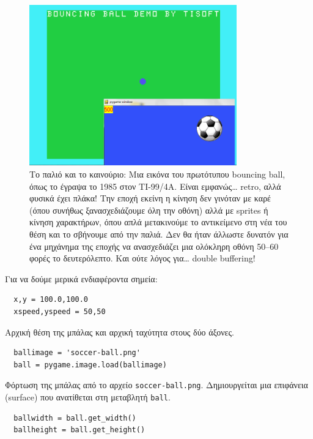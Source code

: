 \begin{figure}
  \centering
  \includegraphics[width=0.8\textwidth]{images/chapter4/bounce1}
  \caption[Παλιό και νέο bouncing ball]{Το παλιό και το καινούριο: Μια εικόνα του πρωτότυπου bouncing ball,  όπως το έγραψα το 1985 στον TI-99/4A.  Είναι εμφανώς\ldots{} retro, αλλά φυσικά έχει πλάκα! Την εποχή εκείνη η κίνηση δεν γινόταν με καρέ (όπου συνήθως ξανασχεδιάζουμε όλη την οθόνη) αλλά με sprites ή κίνηση χαρακτήρων, όπου απλά μετακινούμε το αντικείμενο στη νέα του θέση και το σβήνουμε από την παλιά. Δεν θα ήταν άλλωστε δυνατόν για ένα μηχάνημα της εποχής να ανασχεδιάζει μια ολόκληρη οθόνη 50--60 φορές το δευτερόλεπτο. Και ούτε λόγος για\ldots{} double buffering!}
  \label{4-1}
\end{figure}

Για να δούμε μερικά ενδιαφέροντα σημεία:

\begin{verbatim}
  x,y = 100.0,100.0
  xspeed,yspeed = 50,50
\end{verbatim}

Αρχική θέση της μπάλας και αρχική ταχύτητα στους δύο άξονες.

\begin{verbatim}
  ballimage = 'soccer-ball.png'
  ball = pygame.image.load(ballimage)
\end{verbatim}

Φόρτωση της μπάλας από το αρχείο {\tt soccer-ball.png}. Δημιουργείται μια επιφάνεια (surface) που ανατίθεται στη μεταβλητή {\tt ball}.

\begin{verbatim}
  ballwidth = ball.get_width()
  ballheight = ball.get_height()
\end{verbatim}

